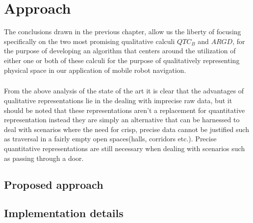 
\chapter{Approach}
The conclusions drawn in the previous chapter, allow us the liberty of focusing specifically on the two most promising qualitative calculi $QTC_B$ and $ARGD$, for the purpose of developing an algorithm that centers around the utilization of either one or both of these calculi for the purpose of qualitatively representing physical space in our application of mobile robot navigation.

\paragraph{} From the above analysis of the state of the art it is clear that the advantages of qualitative representations lie in the dealing with imprecise raw data, but it should be noted that these representations aren't a replacement for quantitative representation instead they are simply an alternative that can be harnessed to deal with scenarios where the need for crisp, precise data cannot be justified such as traversal in a fairly empty open spaces(halls, corridors etc.). Precise quantitative representations are still necessary when dealing with scenarios such as passing through a door.
\section{Proposed approach}


\section{Implementation details}
